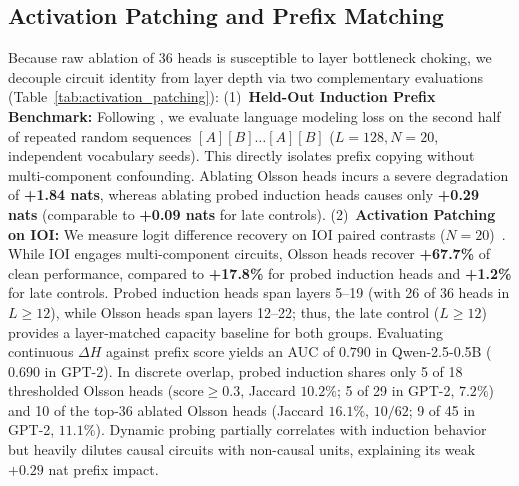 \documentclass[11pt]{article}
\begin{document}
\subsection{Activation Patching and Prefix Matching}
Because raw ablation of 36 heads is susceptible to layer bottleneck choking, we decouple circuit identity from layer depth via two complementary evaluations (Table~\ref{tab:activation_patching}): (1)~\textbf{Held-Out Induction Prefix Benchmark:} Following \citet{olsson2022incontext}, we evaluate language modeling loss on the second half of repeated random sequences $[A][B]\dots[A][B]$ ($L=128, N=20$, independent vocabulary seeds). This directly isolates prefix copying without multi-component confounding. Ablating Olsson heads incurs a severe degradation of \textbf{+1.84 nats}, whereas ablating probed induction heads causes only \textbf{+0.29 nats} (comparable to \textbf{+0.09 nats} for late controls). (2)~\textbf{Activation Patching on IOI:} We measure logit difference recovery on IOI paired contrasts ($N=20$)~\cite{wang2023ioi}. While IOI engages multi-component circuits, Olsson heads recover \textbf{+67.7\%} of clean performance, compared to \textbf{+17.8\%} for probed induction heads and \textbf{+1.2\%} for late controls. Probed induction heads span layers 5--19 (with 26 of 36 heads in $L \ge 12$), while Olsson heads span layers 12--22; thus, the late control ($L \ge 12$) provides a layer-matched capacity baseline for both groups.
Evaluating continuous $\Delta H$ against prefix score yields an AUC of $0.790$ in Qwen-2.5-0.5B ($0.690$ in GPT-2). In discrete overlap, probed induction shares only 5 of 18 thresholded Olsson heads ($\text{score} \ge 0.3$, Jaccard $10.2\%$; 5 of 29 in GPT-2, $7.2\%$) and 10 of the top-36 ablated Olsson heads (Jaccard $16.1\%$, $10/62$; 9 of 45 in GPT-2, $11.1\%$). Dynamic probing partially correlates with induction behavior but heavily dilutes causal circuits with non-causal units, explaining its weak $+0.29$ nat prefix impact.
\end{document}
